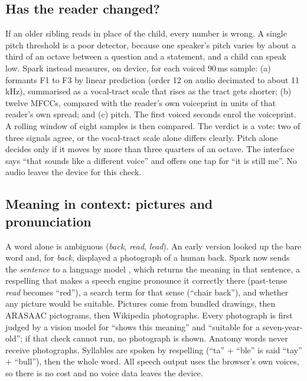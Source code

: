 \documentclass[manuscript, screen, review, anonymous]{acmart}
\begin{document}
\subsection{Has the reader changed?}
\label{sec:voice}
If an older sibling reads in place of the child, every number is wrong. A single pitch threshold is a poor detector, because one speaker's pitch varies by about a third of an octave between a question and a statement, and a child can speak low. Spark instead measures, on device, for each voiced 90\,ms sample: (a) formants F1 to F3 by linear prediction (order 12 on audio decimated to about 11\,kHz), summarised as a vocal-tract scale that rises as the tract gets shorter; (b) twelve MFCCs, compared with the reader's own voiceprint in units of that reader's own spread; and (c) pitch. The first voiced seconds enrol the voiceprint. A rolling window of eight samples is then compared. The verdict is a vote: two of three signals agree, or the vocal-tract scale alone differs clearly. Pitch alone decides only if it moves by more than three quarters of an octave. The interface says ``that sounds like a different voice'' and offers one tap for ``it is still me''. No audio leaves the device for this check.

\subsection{Meaning in context: pictures and pronunciation}
A word alone is ambiguous (\emph{back}, \emph{read}, \emph{lead}). An early version looked up the bare word and, for \emph{back}, displayed a photograph of a human back. Spark now sends the \emph{sentence} to a language model \cite{llama3}, which returns the meaning in that sentence, a respelling that makes a speech engine pronounce it correctly there (past-tense \emph{read} becomes ``red''), a search term for that sense (``chair back''), and whether any picture would be suitable. Pictures come from bundled drawings, then ARASAAC pictograms, then Wikipedia photographs. Every photograph is first judged by a vision model for ``shows this meaning'' and ``suitable for a seven-year-old''; if that check cannot run, no photograph is shown. Anatomy words never receive photographs. Syllables are spoken by respelling (``ta'' + ``ble'' is said ``tay'' + ``bull''), then the whole word. All speech output uses the browser's own voices, so there is no cost and no voice data leaves the device.
\end{document}
